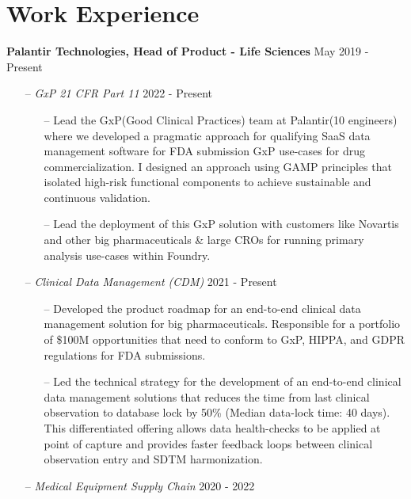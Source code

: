 \documentclass[a4paper,12pt]{article}
\begin{document}
\section{Work Experience}

\textbf{Palantir Technologies, Head of Product - Life Sciences} \hfill May 2019 - Present
    \begin{itemize}[nosep,after=\strut, leftmargin=1em, itemsep=3pt]
        \item[--] \textit{GxP 21 CFR Part 11} \hfill 2022 - Present
        \begin{itemize}[nosep,after=\strut, leftmargin=1em, itemsep=3pt]
            \item[--] Lead the GxP(Good Clinical Practices) team at Palantir(10 engineers) where we developed a pragmatic approach for qualifying SaaS data management software for FDA submission GxP use-cases for drug commercialization. I designed an approach using GAMP principles that isolated high-risk functional components to achieve sustainable and continuous validation.
            \item[--] Lead the deployment of this GxP solution with customers like Novartis and other big pharmaceuticals & large CROs for running primary analysis use-cases within Foundry.
        \end{itemize}
        \item[--] \textit{Clinical Data Management (CDM)} \hfill 2021 - Present
        \begin{itemize}[nosep,after=\strut, leftmargin=1em, itemsep=3pt]
            \item[--] Developed the product roadmap for an end-to-end clinical data management solution for big pharmaceuticals. Responsible for a portfolio of \$100M opportunities that need to conform to GxP, HIPPA, and GDPR regulations for FDA submissions.
            \item[--] Led the technical strategy for the development of an end-to-end clinical data management solutions that reduces the time from last clinical observation to database lock by 50\% (Median data-lock time: 40 days). This differentiated offering allows data health-checks to be applied at point of capture and provides faster feedback loops between clinical observation entry and SDTM harmonization.
        \end{itemize}
        \item[--] \textit{Medical Equipment Supply Chain} \hfill 2020 - 2022
        \begin{itemize}[nosep,after=\strut, leftmargin=1em, itemsep=3pt]

\end{itemize}
\end{itemize}
\end{document}
